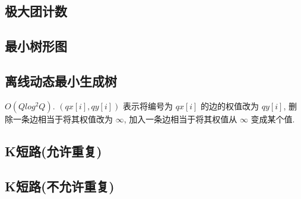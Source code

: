 \documentclass[landscape, twocolumn, 8pt, a4paper, twoside]{extarticle}
\begin{document}
  \subsection{极大团计数}
    

  \subsection{最小树形图}
    

  \subsection{离线动态最小生成树}
    $O (Q log^2 Q) $.
    $(qx[i], qy[i])$ 表示将编号为 $qx[i]$ 的边的权值改为 $qy[i]$,
    删除一条边相当于将其权值改为 $\infty$,
    加入一条边相当于将其权值从 $\infty$ 变成某个值.
    

  \subsection{K短路(允许重复)}
    

  \subsection{K短路(不允许重复)}
    
  
\end{document}

